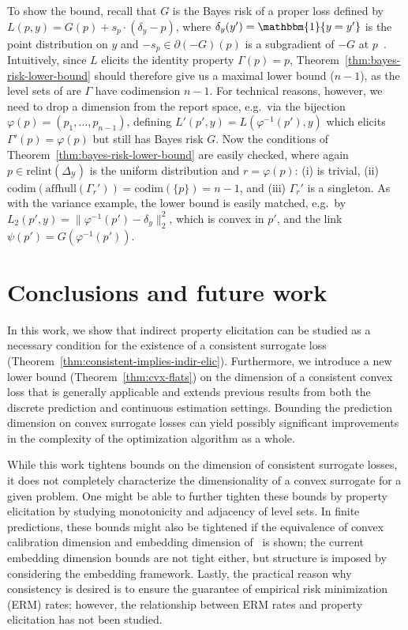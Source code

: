 \documentclass{article}
\newcommand{\simplex}{\Delta_\Y}
\newcommand{\relint}[1]{\mathrm{relint}(#1)}
\newcommand{\codim}{\mathrm{codim}}
\newcommand{\affhull}{\mathrm{affhull}}
\newcommand{\Y}{\mathcal{Y}}
\newcommand{\ones}{\mathbbm{1}}
\begin{document}
To show the bound, recall that $G$ is the Bayes risk of a proper loss defined by $L(p,y) = G(p) + s_p \cdot (\delta_y - p)$, where $\delta_y(y') = \ones\{y=y'\}$ is the point distribution on $y$ and $-s_p \in \partial (-G)(p)$ is a subgradient of $-G$ at $p$~\citep{gneiting2007strictly,reid2009surrogate,frongillo2014general}.
Intuitively, since $L$ elicits the identity property $\Gamma(p)=p$, Theorem~\ref{thm:bayes-risk-lower-bound} should therefore give us a maximal lower bound ($n-1$), as the level sets of are $\Gamma$ have codimension $n-1$.
For technical reasons, however, we need to drop a dimension from the report space, e.g.\ via the bijection $\varphi(p) = (p_1,\ldots,p_{n-1})$, defining $L'(p',y) = L(\varphi^{-1}(p'),y)$ which elicits $\Gamma'(p) = \varphi(p)$ but still has Bayes risk $G$.
Now the conditions of Theorem~\ref{thm:bayes-risk-lower-bound} are easily checked, where again $p\in\relint\simplex$ is the uniform distribution and $r=\varphi(p)$: (i) is trivial, (ii) $\codim(\affhull(\Gamma_r')) = \codim(\{p\}) = n-1$, and (iii) $\Gamma_r'$ is a singleton.
As with the variance example, the lower bound is easily matched, e.g.\ by $L_2(p',y) = \|\varphi^{-1}(p')-\delta_y\|_2^2$, which is convex in $p'$, and the link $\psi(p') = G(\varphi^{-1}(p'))$.


\section{Conclusions and future work}\label{sec:conclusions}
In this work, we show that indirect property elicitation can be studied as a necessary condition for the existence of a consistent surrogate loss (Theorem~\ref{thm:consistent-implies-indir-elic}).
Furthermore, we introduce a new lower bound (Theorem~\ref{thm:cvx-flats}) on the dimension of a consistent convex loss that is generally applicable and extends previous results from both the discrete prediction and continuous estimation settings.
Bounding the prediction dimension on convex surrogate losses can yield possibly significant improvements in the complexity of the optimization algorithm as a whole.

While this work tightens bounds on the dimension of consistent surrogate losses, it does not completely characterize the dimensionality of a convex surrogate for a given problem.
One might be able to further tighten these bounds by property elicitation by studying monotonicity and adjacency of level sets.
In finite predictions, these bounds might also be tightened if the equivalence of convex calibration dimension and embedding dimension of~\cite{finocchiaro2020embedding} is shown; the current embedding dimension bounds are not tight either, but structure is imposed by considering the embedding framework.
Lastly, the practical reason why consistency is desired is to ensure the guarantee of empirical risk minimization (ERM) rates; however, the relationship between ERM rates and property elicitation has not been studied.
\end{document}
